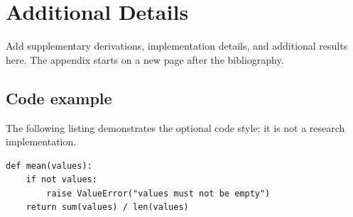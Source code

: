 \section{Additional Details}
\label{app:details}

Add supplementary derivations, implementation details, and additional results
here. The appendix starts on a new page after the bibliography.

\subsection{Code example}
The following listing demonstrates the optional code style; it is not a research
implementation.
\begin{lstlisting}[style=pythonstyle]
def mean(values):
    if not values:
        raise ValueError("values must not be empty")
    return sum(values) / len(values)
\end{lstlisting}
